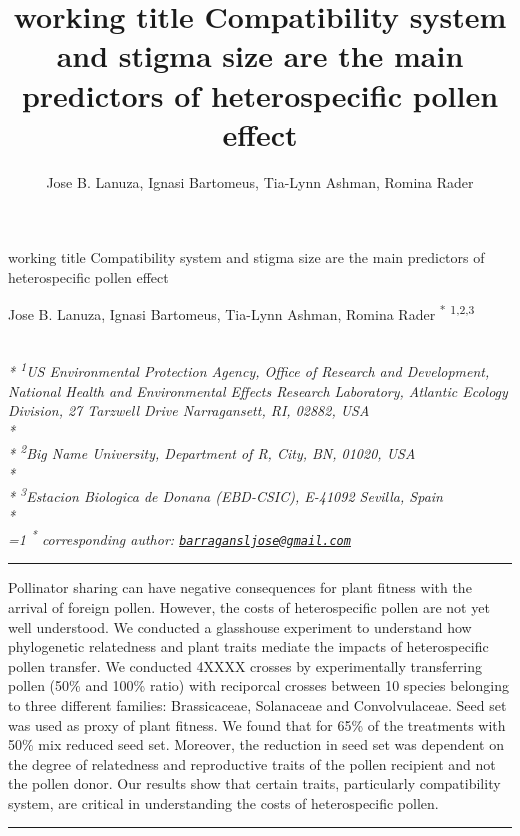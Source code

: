 \documentclass[11pt,a4paper]{article}
\title{working title Compatibility system and stigma size are the main
predictors of heterospecific pollen effect}
\author{
Jose B. Lanuza, Ignasi Bartomeus, Tia-Lynn Ashman, Romina Rader
}
\date{}
\begin{document}
\begin{singlespace}
\begin{center}
\huge working title Compatibility system and stigma size are the main
predictors of heterospecific pollen effect
\end{center}
\begin{center}
\large
Jose B. Lanuza, Ignasi Bartomeus, Tia-Lynn Ashman, Romina Rader \textsuperscript{*} \textsuperscript{1,2,3} 
\end{center}
\begin{justify}
\footnotesize \emph{ 
\\*
\textsuperscript{1}US Environmental Protection Agency, Office of Research and Development,
National Health and Environmental Effects Research Laboratory, Atlantic
Ecology Division, 27 Tarzwell Drive Narragansett, RI, 02882, USA\\*
\\*
\textsuperscript{2}Big Name University, Department of R, City, BN, 01020, USA\\*
\\*
\textsuperscript{3}Estacion Biologica de Donana (EBD-CSIC), E-41092 Sevilla, Spain\\*
}
\setcounter{num}{1}
\\[0.1cm]
\footnotesize \emph{ 
\ifnum\value{num}=1%
\textsuperscript{*} corresponding author:
\fi
\href{mailto:barragansljose@gmail.com}{\nolinkurl{barragansljose@gmail.com}}
}
\end{justify}
\normalsize

\end{singlespace}


\singlespace

\vspace{2mm}\hrule

Pollinator sharing can have negative consequences for plant fitness with
the arrival of foreign pollen. However, the costs of heterospecific
pollen are not yet well understood. We conducted a glasshouse experiment
to understand how phylogenetic relatedness and plant traits mediate the
impacts of heterospecific pollen transfer. We conducted 4XXXX crosses by
experimentally transferring pollen (50\% and 100\% ratio) with
reciporcal crosses between 10 species belonging to three different
families: Brassicaceae, Solanaceae and Convolvulaceae. Seed set was used
as proxy of plant fitness. We found that for 65\% of the treatments with
50\% mix reduced seed set. Moreover, the reduction in seed set was
dependent on the degree of relatedness and reproductive traits of the
pollen recipient and not the pollen donor. Our results show that certain
traits, particularly compatibility system, are critical in understanding
the costs of heterospecific pollen. \vspace{3mm}\hrule
\end{document}
